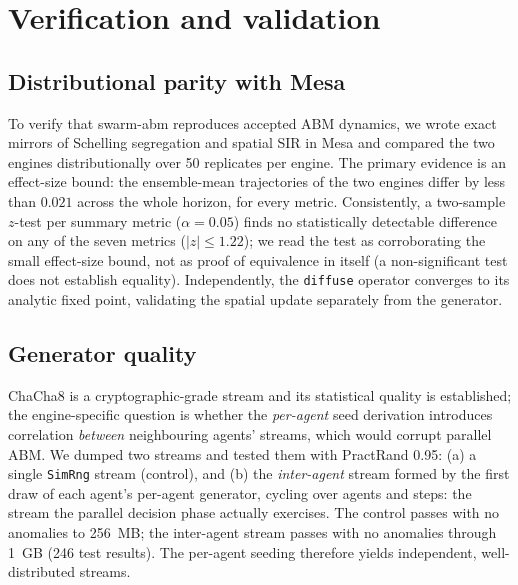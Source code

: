 \documentclass[review]{elsarticle}
\begin{document}
\section{Verification and validation}
\label{sec:vv}

\subsection{Distributional parity with Mesa}
To verify that swarm-abm reproduces accepted ABM dynamics, we wrote exact
mirrors of Schelling segregation \cite{schelling1971segregation} and spatial
SIR in Mesa and compared the two engines distributionally over 50 replicates
per engine. The primary evidence is an effect-size bound: the ensemble-mean
trajectories of the two engines differ by less than $0.021$ across the whole
horizon, for every metric. Consistently, a two-sample $z$-test per summary
metric ($\alpha = 0.05$) finds no statistically detectable difference on any of
the seven metrics ($|z| \le 1.22$); we read the test as corroborating the small
effect-size bound, not as proof of equivalence in itself (a non-significant
test does not establish equality). Independently, the \texttt{diffuse}
operator converges to its analytic fixed point, validating the spatial update
separately from the generator.

\subsection{Generator quality}
ChaCha8 is a cryptographic-grade stream and its statistical quality is
established; the engine-specific question is whether the \emph{per-agent} seed
derivation introduces correlation \emph{between} neighbouring agents' streams,
which would corrupt parallel ABM. We dumped two streams and tested them with
PractRand 0.95: (a) a single \texttt{SimRng} stream (control), and (b) the
\emph{inter-agent} stream formed by the first draw of each agent's per-agent
generator, cycling over agents and steps: the stream the parallel decision
phase actually exercises. The control passes with no anomalies to 256~MB; the
inter-agent stream passes with no anomalies through 1~GB (246 test results).
The per-agent seeding therefore yields independent, well-distributed streams.
\end{document}
